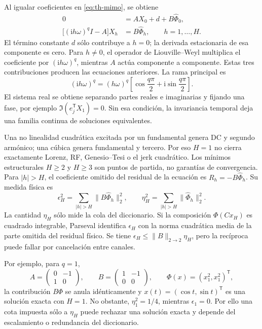 Al igualar coeficientes en \cref{eq:th-mimo}, se obtiene
\begin{align}
 0&=AX_0+d+B\widehat\Phi_0,
 \label{eq:th-dc-balance}\\
 \bigl[(\mathrm ih\omega)^qI-A\bigr]X_h
 &=B\widehat\Phi_h,\qquad h=1,\ldots,H.
 \label{eq:th-harmonic-balance}
\end{align}
El término constante \(d\) sólo contribuye a \(h=0\); la derivada
estacionaria de esa componente es cero. Para \(h\ne0\), el operador de
Liouville--Weyl multiplica el coeficiente por \((\mathrm ih\omega)^q\),
mientras \(A\) actúa componente a componente. Estas tres contribuciones
producen las ecuaciones anteriores. La rama principal es
\[
 (\mathrm ih\omega)^q=(h\omega)^q
 \left[\cos\frac{q\pi}{2}+\mathrm i\sin\frac{q\pi}{2}\right].
\]
El sistema real se obtiene separando partes reales e imaginarias y fijando una
fase, por ejemplo \(\Im(e_j^{\mathsf T}X_1)=0\). Sin esa condición, la
invariancia temporal deja una familia continua de soluciones equivalentes.

Una no linealidad cuadrática excitada por un fundamental genera DC y segundo
armónico; una cúbica genera fundamental y tercero. Por eso \(H=1\) no cierra
exactamente Lorenz, RF, Genesio--Tesi o el jerk cuadrático. Los mínimos
estructurales \(H\ge2\) y \(H\ge3\) son puntos de partida, no garantías de
convergencia. Para \(|h|>H\), el coeficiente omitido del residual de la
ecuación es \(R_h=-B\widehat\Phi_h\). Su medida física es
\begin{equation}
 \epsilon_H^2=\sum_{|h|>H}\|B\widehat\Phi_h\|_2^2,
 \qquad
 \eta_H^2=\sum_{|h|>H}\|\widehat\Phi_h\|_2^2.
 \label{eq:th-physical-harmonic-tail}
\end{equation}
La cantidad \(\eta_H\) sólo mide la cola del diccionario. Si la composición
\(\Phi(Cx_H)\) es cuadrado integrable, Parseval identifica
\(\epsilon_H\) con la norma cuadrática media de la parte omitida del
residual físico. Se tiene
\(\epsilon_H\le\|B\|_{2\to2}\eta_H\), pero la recíproca puede fallar por
cancelación entre canales.

Por ejemplo, para \(q=1\),
\[
 A=\begin{pmatrix}0&-1\\1&0\end{pmatrix},\qquad
 B=\begin{pmatrix}1&-1\\0&0\end{pmatrix},\qquad
 \Phi(x)=(x_1^2,x_1^2)^{\mathsf T},
\]
la contribución \(B\Phi\) se anula idénticamente y
\(x(t)=(\cos t,\sin t)^{\mathsf T}\) es una solución exacta con \(H=1\).
No obstante, \(\eta_1^2=1/4\), mientras \(\epsilon_1=0\). Por ello una
cota impuesta sólo a \(\eta_H\) puede rechazar una solución exacta y depende
del escalamiento o redundancia del diccionario.

